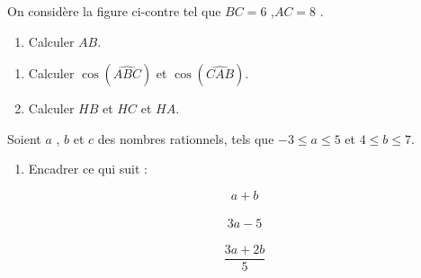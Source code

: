 \documentclass[a4paper,12pt]{article}
\begin{document}
\devoir[sem=2,prv=true,ds=true,num=5 ,niv=2 ,date=08/05/2023]

\begin{exo}[8]
\begin{minipage}{.65\linewidth}
On considère la figure ci-contre tel que $BC=6$ ,$AC=8$ .
\begin{enumerate}
\item Calculer  $AB$.

\anserline[4]
\end{enumerate}
\end{minipage}
\begin{minipage}{.35\linewidth}
\end{minipage}
\begin{enumerate}[start=2]

\item Calculer $\cos(\widehat{ABC})$ et $\cos(\widehat{CAB})$.
\begin{multicols}{2}
\anserline[2]
\columnbreak

\anserline[2]
\end{multicols}
\item Calculer $HB$ et $HC$ et $HA$.
\begin{multicols}{3}
\anserline[3]
\columnbreak

\anserline[3]
\columnbreak

\anserline[3]
\end{multicols}
\end{enumerate}
\end{exo}

\begin{exo}[6]
Soient $a$ , $b$ et $c$ des nombres rationnels, tels que $-3\leq a \leq 5$ et $4\leq b \leq 7$.
\begin{enumerate}
\item Encadrer ce qui suit :\vspace{-1cm}
\begin{multicols}{3}
\[a+b\]\\ \anserline[3]
\[3a-5\]\\ \anserline[3]
\[\frac{3a+2b}{5}\]\\ \anserline[3]
\end{multicols}
\end{enumerate}
\end{exo}
\end{document}
